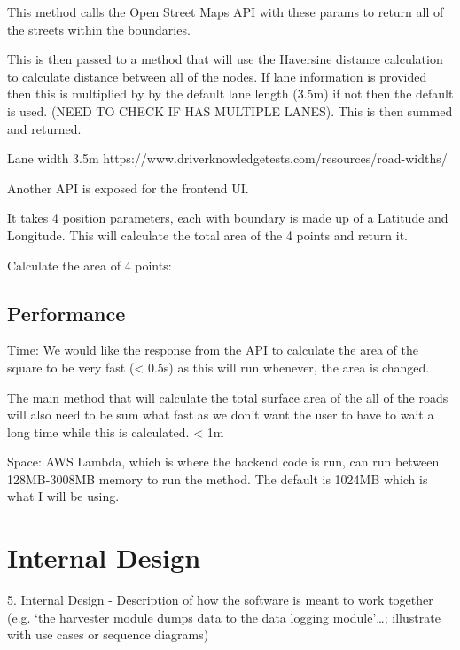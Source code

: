 \documentclass[a4paper,11pt]{article}
\begin{document}
This method calls the Open Street Maps API with these params to return all of the streets within the boundaries.

This is then passed to a method that will use the Haversine distance calculation to calculate distance between all of the nodes. If lane information is provided then this is multiplied by by the default lane length (3.5m) if not then the default is used. (NEED TO CHECK IF HAS MULTIPLE LANES). This is then summed and returned.

Lane width 3.5m https://www.driverknowledgetests.com/resources/road-widths/


Another API is exposed for the frontend UI.

It takes 4 position parameters, each with boundary is made up of a Latitude and Longitude. This will calculate the total area of the 4 points and return it.

Calculate the area of 4 points:

\subsection{Performance}


Time:
We would like the response from the API to calculate the area of the square to be very fast (< 0.5s) as this will run whenever, the area is changed.

The main method that will calculate the total surface area of the all of the roads will also need to be sum what fast as we don't want the user to have to wait a long time while this is calculated. < 1m

Space:
AWS Lambda, which is where the backend code is run, can run between 128MB-3008MB memory to run the method. The default is 1024MB which is what I will be using.


\section{Internal Design}

5. Internal Design - Description of how the software is meant to work together (e.g. ‘the harvester module dumps data to the data logging module’…; illustrate with use cases or sequence diagrams)

\end{document}
